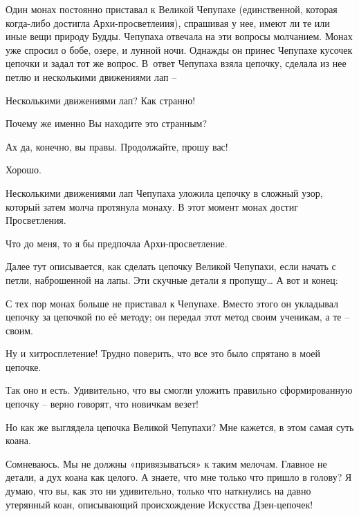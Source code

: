 \documentclass[../main.tex]{subfiles}
\begin{document}
\begin{dialogue}
\begin{koan}
    Один монах постоянно приставал к Великой Чепупахе (единственной, которая когда-либо достигла Архи-просветлеиия), спрашивая у нее, имеют ли те или иные вещи природу Будды. Чепупаха отвечала на эти вопросы молчанием. Монах уже спросил о бобе, озере, и лунной ночи. Однажды он принес Чепупахе кусочек цепочки и задал тот же вопрос. В~ответ Чепупаха взяла цепочку, сделала из нее петлю и несколькими движениями лап \---
\end{koan}

 Несколькими движениями лап? Как странно!

 Почему же именно Вы находите это странным?

 Ах да, конечно, вы правы. Продолжайте, прошу вас!

 Хорошо.

\begin{koan}
    Несколькими движениями лап Чепупаха уложила цепочку в сложный узор, который затем молча протянула монаху. В этот момент монах достиг Просветления.
\end{koan}

 Что до меня, то я бы предпочла Архи-просветление.

 Далее тут описывается, как сделать цепочку Великой Чепупахи, если начать с петли, наброшенной на лапы. Эти скучные детали я пропущу\ldots{} А вот и конец:

\begin{koan}
    С тех пор монах больше не приставал к Чепупахе. Вместо этого он укладывал цепочку за цепочкой по её методу; он передал этот метод своим ученикам, а те \--- своим.
\end{koan}

 Ну и хитросплетение! Трудно поверить, что все это было спрятано в моей цепочке.

 Так оно и есть. Удивительно, что вы смогли уложить правильно сформированную цепочку \--- верно говорят, что новичкам везет!

 Но как же выглядела цепочка Великой Чепупахи? Мне кажется, в этом самая суть коана.

 Сомневаюсь. Мы не должны «привязываться» к таким мелочам. Главное не детали, а дух коана как целого. А знаете, что мне только что пришло в голову? Я думаю, что вы, как это ни удивительно, только что наткнулись на давно утерянный коан, описывающий происхождение Искусства Дзен-цепочек!


\end{dialogue}
\end{document}
